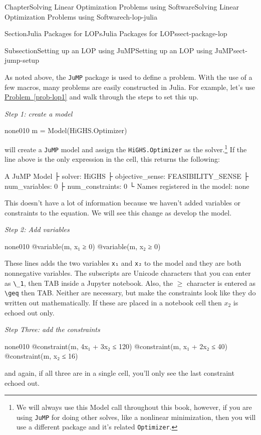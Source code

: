 \documentclass[oneside,10pt,]{book}
\newcommand{\xreffont}{\relax}
\newcommand{\mono}[1]{\texttt{#1}}
\numberwithin{equation}{section}
\begin{document}
\begin{chapterptx}{Chapter}{Solving Linear Optimization Problems using Software}{}{Solving Linear Optimization Problems using Software}{}{}{ch-lop-julia}
\begin{sectionptx}{Section}{Julia Packages for LOPs}{}{Julia Packages for LOPs}{}{}{sect-package-lop}
\begin{subsectionptx}{Subsection}{Setting up an LOP using JuMP}{}{Setting up an LOP using JuMP}{}{}{sect-jump-setup}
\par
As noted above, the \mono{JuMP} package is used to define a problem. With the use of a few macros, many problems are easily constructed in Julia. For example, let's use \hyperref[prob-lop1]{Problem~{\xreffont\ref{prob-lop1}}} and walk through the steps to set this up.%
\par
\emph{Step 1: create a model}%
\begin{program}{none}{0}{1}{0}
m = Model(HiGHS.Optimizer)
\end{program}
will create a \mono{JuMP} model and assign the \mono{HiGHS.Optimizer} as the solver.\footnote{We will always use this Model call throughout this book, however, if you are using \mono{JuMP} for doing other solves, like a nonlinear minimization, then you will use a different package and it's related \mono{Optimizer}.\label{sect-jump-setup-8-3}} If the line above is the only expression in the cell, this returns the following:%
\par
%
\begin{codedisplay}
A JuMP Model
├ solver: HiGHS
├ objective_sense: FEASIBILITY_SENSE
├ num_variables: 0
├ num_constraints: 0
└ Names registered in the model: none
\end{codedisplay}
%
\par
This doesn't have a lot of information because we haven't added variables or constraints to the equation. We will see this change as develop the model.%
\par
\emph{Step 2: Add variables}%
\begin{program}{none}{0}{1}{0}
@variable(m, x₁ ≥ 0)
@variable(m, x₂ ≥ 0)
\end{program}
These lines adds the two variables \mono{x₁} and \mono{x₂} to the model and they are both nonnegative variables. The subscripts are Unicode characters that you can enter as \mono{\textbackslash{}\_1}, then TAB inside a Jupyter notebook. Also, the \(\geq\) character is entered as \mono{\textbackslash{}geq} then TAB. Neither are necessary, but make the constraints look like they do written out mathematically. If these are placed in a notebook cell then \(x_2\) is echoed out only.%
\par
\emph{Step Three: add the constraints}%
\begin{program}{none}{0}{1}{0}
@constraint(m, 4x₁ + 3x₂ ≤ 120)
@constraint(m, x₁ + 2x₂ ≤ 40)
@constraint(m, x₂ ≤ 16)
\end{program}
and again, if all three are in a single cell, you'll only see the last constraint echoed out.%
\par

\end{subsectionptx}
\end{sectionptx}
\end{chapterptx}
\end{document}
